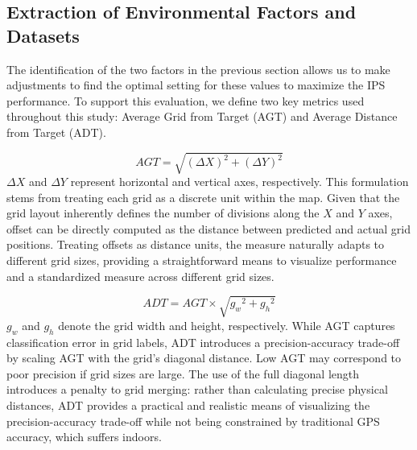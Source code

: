 \documentclass[runningheads]{llncs}
\begin{document}
\subsection{Extraction of Environmental Factors and Datasets}
The identification of the two factors in the previous section allows us to make adjustments to find the optimal setting for these values to maximize the IPS performance. 
To support this evaluation, we define two key metrics used throughout this study: Average Grid from Target (AGT) and Average Distance from Target (ADT).

\begin{equation}
	AGT = \sqrt{(\Delta X)^2 + (\Delta Y)^2}
	\label{eq:agt}
\end{equation}
$\Delta X$ and $\Delta Y$ represent horizontal and vertical axes, respectively. This formulation stems from treating each grid as a discrete unit within the map. Given that the grid layout inherently defines the number of divisions along the $X$ and $Y$ axes, offset can be directly computed as the distance between predicted and actual grid positions. Treating offsets as distance units, the measure naturally adapts to different grid sizes, providing a straightforward means to visualize performance and a standardized measure across different grid sizes.

\begin{equation}
	ADT = AGT \times \sqrt{{g_w}^2 + {g_h}^2}
	\label{eq:adt}
\end{equation}
$g_w$ and $g_h$ denote the grid width and height, respectively. While AGT captures classification error in grid labels, ADT introduces a precision-accuracy trade-off by scaling AGT with the grid’s diagonal distance. Low AGT may correspond to poor precision if grid sizes are large. The use of the full diagonal length introduces a penalty to grid merging: rather than calculating precise physical distances, ADT provides a practical and realistic means of visualizing the precision-accuracy trade-off while not being constrained by traditional GPS accuracy, which suffers indoors.
\end{document}
